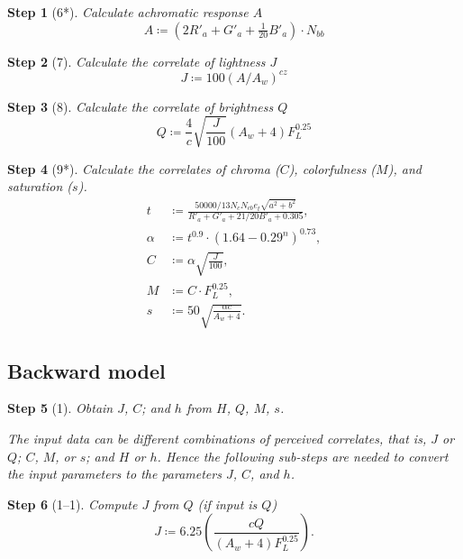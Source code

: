 \documentclass[twocolumn]{scrartcl}
\theoremstyle{named}
\newtheorem*{step}{Step}
\begin{document}
\begin{step}[6*]
Calculate achromatic response $A$
\[
  A\coloneqq (2 R'_a + G'_a + \tfrac{1}{20} B'_a) \cdot N_{bb}
  \]
\end{step}

\begin{step}[7]
Calculate the correlate of lightness $J$
\[
  J \coloneqq 100 {(A / A_w)}^{cz}
  \]
\end{step}

\begin{step}[8]
  Calculate the correlate of brightness $Q$
  \[
    Q \coloneqq \frac{4}{c} \sqrt{\frac{J}{100}} (A_w+4) F_L^{0.25}
    \]
\end{step}

\begin{step}[9*]
Calculate the correlates of chroma ($C$), colorfulness ($M$), and saturation
  ($s$).
\begin{align*}
  t&\coloneqq \frac{50000/13 N_c N_{cb} e_t \sqrt{a^2 + b^2}}{R'_a + G'_a + 21/20 B'_a + 0.305},\\
  \alpha&\coloneqq t^{0.9} \cdot {(1.64 - 0.29^n)}^{0.73},\\
  C&\coloneqq \alpha \sqrt{\frac{J}{100}},\\
  M&\coloneqq C\cdot F_L^{0.25},\\
  s &\coloneqq 50 \sqrt{\frac{\alpha c}{A_w + 4}}.
\end{align*}
\end{step}

\subsection{Backward model}

\begin{step}[1]
  Obtain $J$, $C$; and $h$ from $H$, $Q$, $M$, $s$.

  The input data can be different combinations of perceived correlates, that
  is, $J$ or $Q$; $C$, $M$, or $s$; and $H$ or $h$. Hence the following
  sub-steps are needed to convert the input parameters to the parameters $J$,
  $C$, and $h$.
\end{step}

\begin{step}[1--1]
Compute $J$ from $Q$ (if input is $Q$)
\[
  J\coloneqq 6.25 \left(\frac{cQ}{(A_w+4) F_L^{0.25}}\right).
\]
\end{step}
\end{document}
